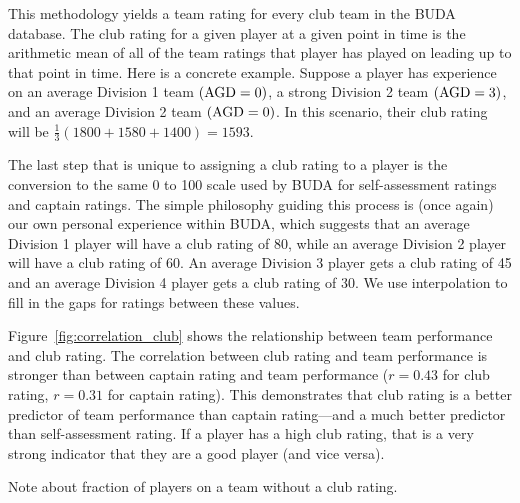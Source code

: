 This methodology yields a team rating for every club team in the BUDA database.  The club rating for a given player at a given point in time is the arithmetic mean of all of the team ratings that player has played on leading up to that point in time.  Here is a concrete example.  Suppose a player has experience on an average Division 1 team $({\rm AGD} = 0)$, a strong Division 2 team $({\rm AGD} = 3)$, and an average Division 2 team $({\rm AGD} = 0)$.  In this scenario, their club rating will be $\frac{1}{3}(1800 + 1580 + 1400) = 1593$.

The last step that is unique to assigning a club rating to a player is the conversion to the same 0 to 100 scale used by BUDA for self-assessment ratings and captain ratings.  The simple philosophy guiding this process is (once again) our own personal experience within BUDA, which suggests that an average Division 1 player will have a club rating of 80, while an average Division 2 player will have a club rating of 60. An average Division 3 player gets a club rating of 45 and an average Division 4 player gets a club rating of 30. We use interpolation to fill in the gaps for ratings between these values.

Figure~\ref{fig:correlation_club} shows the relationship between team performance and club rating. The correlation between club rating and team performance is stronger than between captain rating and team performance ($r = 0.43$ for club rating, $r = 0.31$ for captain rating). This demonstrates that club rating is a better predictor of team performance than captain rating---and a much better predictor than self-assessment rating. If a player has a high club rating, that is a very strong indicator that they are a good player (and vice versa).

Note about fraction of players on a team without a club rating.